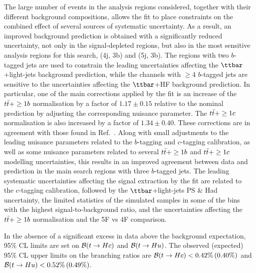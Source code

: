 The large number of events in the analysis regions considered, together with their different background compositions, allows
the fit to place constraints on the combined effect of several sources of systematic uncertainty.
As a result, an improved background prediction is obtained with a significantly reduced uncertainty, not only in the 
signal-depleted regions, but also in the most sensitive analysis regions for this search, (4j, 3b) and (5j, 3b).
The regions with two $b$-tagged jets are used to constrain the leading uncertainties affecting the $\ttbar$+light-jets background prediction,
while the channels with $\geq$4 $b$-tagged jets are sensitive to the uncertainties affecting the $\ttbar$+HF background prediction.  
In particular, one of the main corrections applied by the fit is an increase of the $t\bar{t}+\geq1b$ normalisation by a factor of $1.17 \pm  0.15$ 
relative to the nominal prediction by adjusting the corresponding nuisance parameter.  The $t\bar{t}+\geq1c$ normalisation is also increased
by a factor of $1.34 \pm  0.40$. These corrections are in agreement with those found in Ref.~\cite{Aaboud:2017rss}.
Along with small adjustments to the leading nuisance parameters related to the $b$-tagging and $c$-tagging calibration,
as well as some nuisance parameters related to several $t\bar{t}+\geq1b$ and $t\bar{t}+\geq1c$ modelling uncertainties, this results in an improved 
agreement between data and prediction in the main search regions with three $b$-tagged jets.
The leading systematic uncertainties affecting the signal extraction by the fit are related to the $c$-tagging calibration,
followed by the $\ttbar$+light-jets PS \& Had uncertainty, the limited statistics of the simulated samples in some of the bins with 
the highest signal-to-background ratio, and the uncertainties affecting the $t\bar{t}+\geq1b$ normalisation and the 5F vs 4F comparison.

In the absence of a significant excess in data above the background expectation, 95\% CL limits are set on $\mathcal{B}(t\to Hc)$ and $\mathcal{B}(t\to Hu)$.
The observed (expected) 95\% CL upper limits on the branching ratios 
are $\mathcal{B}(t\to Hc)<0.42\%\,(0.40\%)$ and $\mathcal{B}(t\to Hu)<0.52\%\,(0.49\%)$.

